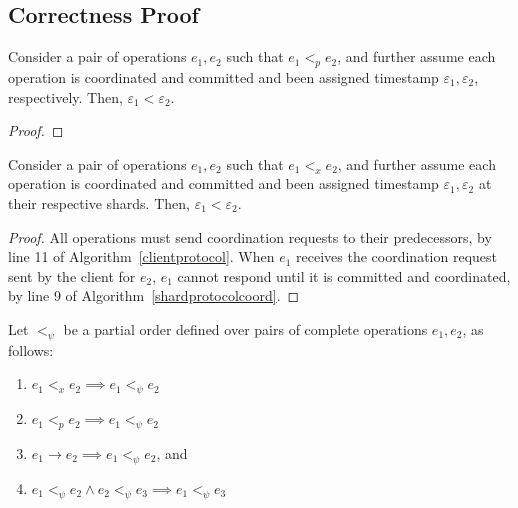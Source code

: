 \subsection{Correctness Proof}
\label{sec:correctness}


\begin{lemma}
\label{lemma1}
Consider a pair of operations $e_1, e_2$ such that $e_1 <_p e_2$, and further assume each operation is coordinated and committed and been assigned timestamp $\varepsilon_1, \varepsilon_2$, respectively. Then, $\varepsilon_1 < \varepsilon_2$.
\end{lemma}
\begin{proof}
\end{proof}

\begin{lemma}
\label{lemma2}
Consider a pair of operations $e_1, e_2$ such that $e_1 <_x e_2$, and further assume each operation is coordinated and committed and been assigned timestamp $\varepsilon_1, \varepsilon_2$ at their respective shards. Then, $\varepsilon_1 < \varepsilon_2$.
\end{lemma}
\begin{proof}
All operations must send coordination requests to their predecessors, by line 11 of Algorithm~\ref{clientprotocol}. When $e_1$ receives the coordination request sent by the client for $e_2$, $e_1$ cannot respond until it is committed and coordinated, by line 9 of Algorithm~\ref{shardprotocolcoord}.


\end{proof}


Let $<_\psi$ be a partial order defined over pairs of complete operations $e_1, e_2$, as follows:
\begin{enumerate}
    \item $e_1 <_x e_2 \implies e_1 <_\psi e_2$
    \item $e_1 <_p e_2 \implies e_1 <_\psi e_2$
    \item $e_1 \rightarrow e_2 \implies e_1 <_\psi e_2$, and
    \item $e_1 <_\psi e_2 \land e_2 <_\psi e_3 \implies e_1 <_\psi e_3$
\end{enumerate}

